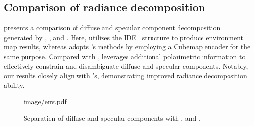 \subsection{Comparison of radiance decomposition}
 presents a comparison of diffuse and specular component decomposition generated by \pandora, \dr, and \polgs. Here, \pandora utilizes the IDE~\cite{verbin2022ref} structure to produce environment map results, whereas \polgs adopts \dr's methods by employing a Cubemap encoder for the same purpose. 
Compared with \dr, \polgs leverages additional polarimetric information to effectively constrain and disambiguate diffuse and specular components. 
Notably, our results closely align with \pandora's, demonstrating improved radiance decomposition ability.
\begin{figure}
	\begin{overpic}[width=\linewidth, trim={0pt 0pt 0pt 0pt}]{image/env.pdf}
		
	\end{overpic}
	\vspace{-1.5em}
	\caption{Separation of diffuse and specular components with \pandora, \dr and \polgs.}
	\label{fig:env_compare}
	\vspace{-0em}
\end{figure}
